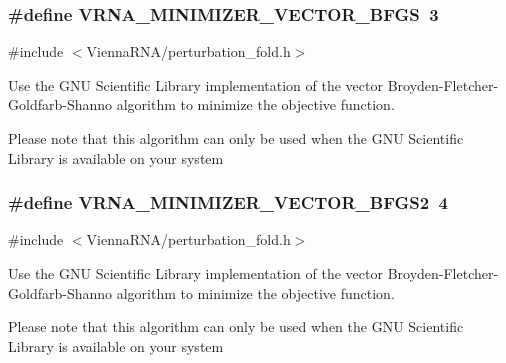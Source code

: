 \subsubsection[{V\+R\+N\+A\+\_\+\+M\+I\+N\+I\+M\+I\+Z\+E\+R\+\_\+\+V\+E\+C\+T\+O\+R\+\_\+\+B\+F\+G\+S}]{\setlength{\rightskip}{0pt plus 5cm}\#define V\+R\+N\+A\+\_\+\+M\+I\+N\+I\+M\+I\+Z\+E\+R\+\_\+\+V\+E\+C\+T\+O\+R\+\_\+\+B\+F\+G\+S~3}\label{group__soft__constraints_ga9be8a702cddf58235571ace11cc41b22}


{\ttfamily \#include $<$Vienna\+R\+N\+A/perturbation\+\_\+fold.\+h$>$}



Use the G\+N\+U Scientific Library implementation of the vector Broyden-\/\+Fletcher-\/\+Goldfarb-\/\+Shanno algorithm to minimize the objective function. 

Please note that this algorithm can only be used when the G\+N\+U Scientific Library is available on your system \hypertarget{group__soft__constraints_ga7b0a65c6c92fa1d8012383ba9d3dcb4f}{}
\subsubsection[{V\+R\+N\+A\+\_\+\+M\+I\+N\+I\+M\+I\+Z\+E\+R\+\_\+\+V\+E\+C\+T\+O\+R\+\_\+\+B\+F\+G\+S2}]{\setlength{\rightskip}{0pt plus 5cm}\#define V\+R\+N\+A\+\_\+\+M\+I\+N\+I\+M\+I\+Z\+E\+R\+\_\+\+V\+E\+C\+T\+O\+R\+\_\+\+B\+F\+G\+S2~4}\label{group__soft__constraints_ga7b0a65c6c92fa1d8012383ba9d3dcb4f}


{\ttfamily \#include $<$Vienna\+R\+N\+A/perturbation\+\_\+fold.\+h$>$}



Use the G\+N\+U Scientific Library implementation of the vector Broyden-\/\+Fletcher-\/\+Goldfarb-\/\+Shanno algorithm to minimize the objective function. 

Please note that this algorithm can only be used when the G\+N\+U Scientific Library is available on your system \hypertarget{group__soft__constraints_ga9ecd2144c2ebed7533233da3986521b0}{}
